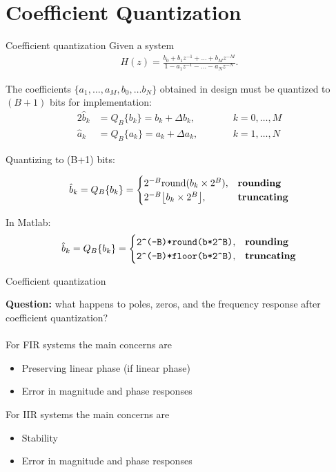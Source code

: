 \documentclass[10pt]{beamer}
\begin{document}
%
\section{Coefficient Quantization}
\begin{frame}{Coefficient quantization}
	Given a system
	\begin{align*}
		H(z) = \frac{b_0 + b_1z^{-1} + \ldots + b_Mz^{-M}}{1 - a_1z^{-1} - \ldots - a_Nz^{-N}}.
	\end{align*}
	
	The coefficients $\{a_1, \ldots, a_M, b_0,\ldots b_N\}$ obtained in design must  be quantized to $(B+1)$ bits for implementation:
	\begin{alignat*}{2}
		\hat{b}_k &= Q_B\{b_k\} = b_k + \Delta b_k, \qquad &&  k = 0, \ldots, M \\
		\hat{a}_k &= Q_B\{a_k\} = a_k + \Delta a_k, \qquad && k = 1, \ldots, N
	\end{alignat*}
	
	\pause
	\vspace{0.25cm}
	Quantizing to (B+1) bits:
	
	\begin{equation*}
	\hat{b}_k = Q_B\{b_k\} = \begin{cases}
	2^{-B}\mathrm{round}(b_k\times 2^B), & \text{\textbf{rounding}} \\
	2^{-B}\big\lfloor b_k\times 2^B\big\rfloor, & \text{\textbf{truncating}}
	\end{cases}
	\end{equation*}
	
	In Matlab:
	\begin{equation*}
	\hat{b}_k = Q_B\{b_k\} = \begin{cases}
	\texttt{2\textasciicircum(-B)*round(b*2\textasciicircum B)}, & \text{\textbf{rounding}} \\
	\texttt{2\textasciicircum(-B)*floor(b*2\textasciicircum B)}, & \text{\textbf{truncating}}
	\end{cases}
	\end{equation*}
\end{frame}

\begin{frame}{Coefficient quantization}

\textbf{Question:} what happens to poles, zeros, and the frequency response after coefficient quantization?
~\\
~\\

For FIR systems the main concerns are
\begin{itemize}
	\item Preserving linear phase (if linear phase)
	\item Error in magnitude and phase responses
\end{itemize}

For IIR systems the main concerns are
\begin{itemize}
	\item Stability
	\item Error in magnitude and phase responses
\end{itemize}

\end{frame}
\end{document}
